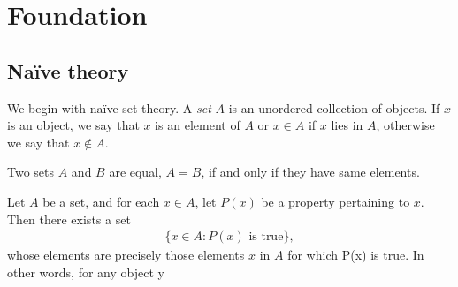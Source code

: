 
\chapter{Foundation}

\section{Na\"ive theory}

We begin with na\"ive set theory. A \emph{set} $A$ is an unordered collection of objects. If $x$ is an object, we say that $x$ is an element of $A$ or $x \in A$ if $x$ lies in $A$, otherwise we say that $x \notin A$.

\begin{axiom}[Extension]
    Two sets $A$ and $B$ are equal, $A = B$, if and only if they have same elements.
\end{axiom}

\begin{axiom}
    Let $A$ be a set, and for each $x \in A$, let $P(x)$ be a property pertaining to $x$. Then there exists a set 
    \begin{align*}
        \{x ∈ A : P(x) \text{ is true}\},
    \end{align*}
    whose elements are precisely those elements $x$ in $A$ for which P(x) is true. In other words, for any object y
\end{axiom}



